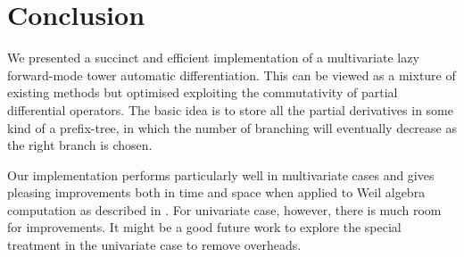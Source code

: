 \documentclass[rims-smooth-paper.tex]{subfiles}
\begin{document}
\section{Conclusion}
\label{sec:concl}
We presented a succinct and efficient implementation of a multivariate lazy forward-mode tower automatic differentiation.
This can be viewed as a mixture of existing methods but optimised exploiting the commutativity of partial differential operators.
The basic idea is to store all the partial derivatives in some kind of a prefix-tree, in which the number of branching will eventually decrease as the right branch is chosen.

Our implementation performs particularly well in multivariate cases and gives pleasing improvements both in time and space when applied to Weil algebra computation as described in \cite{Ishii:2021vw}.
For univariate case, however, there is much room for improvements.
It might be a good future work to explore the special treatment in the univariate case to remove overheads.
\end{document}

